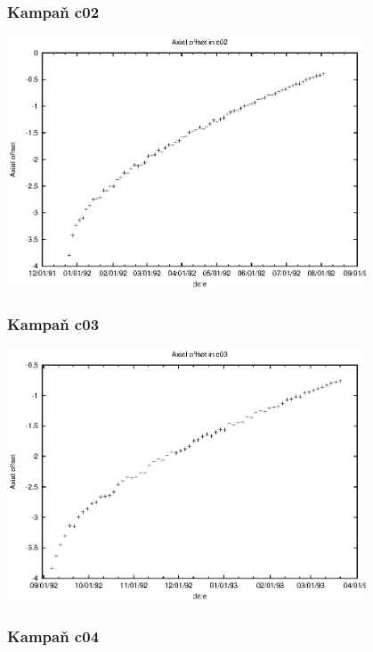 \documentclass[a4paper,twoside,11pt]{article}
\begin{document}
\subsubsection{Kampaň c02}

\begin{center}
\includegraphics[width=0.8\textwidth]{ao_c02.eps}
\end{center}




\subsubsection{Kampaň c03}

\begin{center}
\includegraphics[width=0.8\textwidth]{ao_c03.eps}
\end{center}




\subsubsection{Kampaň c04}
\end{document}
